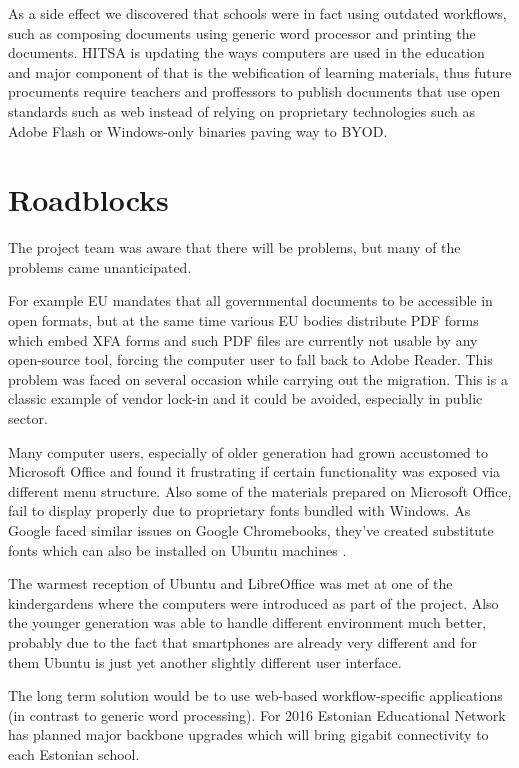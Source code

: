 \documentclass{article}
\begin{document}
As a side effect we discovered that schools were in fact
using outdated workflows, such as composing documents using
generic word processor and printing the documents.
HITSA is updating the ways computers are used in the education
and major component of that is the webification of 
learning materials, thus future procuments require
teachers and proffessors to publish documents that
use open standards such as web instead of relying on
proprietary technologies such as Adobe Flash or
Windows-only binaries paving way to BYOD.

\section{Roadblocks}

The project team was aware that there will be problems,
but many of the problems came unanticipated.

For example EU mandates that all governmental documents to
be accessible in open formats, but at the same time
various EU bodies distribute PDF forms which
embed XFA forms and such PDF files are currently not
usable by any open-source tool, forcing the computer
user to fall back to Adobe Reader.
This problem was faced on several occasion while
carrying out the migration.
This is a classic example of vendor lock-in and
it could be avoided, especially in public sector.

Many computer users, especially of older generation
had grown accustomed to 
Microsoft Office and found it frustrating
if certain functionality was exposed
via different menu structure.
Also some of the materials prepared on Microsoft Office,
fail to display properly due to proprietary fonts
bundled with Windows.
As Google faced similar issues on Google Chromebooks,
they've created substitute fonts which can also be installed
on Ubuntu machines \cite{substituting-fonts}.

The warmest reception of Ubuntu and LibreOffice
was met at one of the kindergardens where the computers were
introduced as part of the project.
Also the younger generation was able to handle
different environment much better,
probably due to the fact that smartphones
are already very different and for them Ubuntu
is just yet another slightly different user interface.

The long term solution would be to use web-based
workflow-specific applications (in contrast
to generic word processing).
For 2016 Estonian Educational Network has planned major
backbone upgrades which will bring gigabit connectivity to each
Estonian school.
\end{document}
